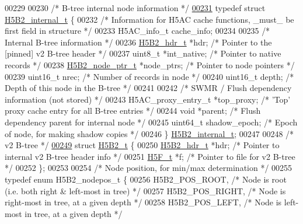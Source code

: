 \begin{DoxyCode}
{{00229 
00230 \textcolor{comment}{/* B-tree internal node information */}
\hyperlink{struct_h5_b2__internal__t}{00231} \textcolor{keyword}{typedef} \textcolor{keyword}{struct }\hyperlink{struct_h5_b2__internal__t}{H5B2\_internal\_t} \{
00232     \textcolor{comment}{/* Information for H5AC cache functions, \_must\_ be first field in structure */}
00233     H5AC\_info\_t cache\_info;
00234 
00235     \textcolor{comment}{/* Internal B-tree information */}
00236     \hyperlink{struct_h5_b2__hdr__t}{H5B2\_hdr\_t}    *hdr;       \textcolor{comment}{/* Pointer to the [pinned] v2 B-tree header   */}
00237     uint8\_t     *int\_native;    \textcolor{comment}{/* Pointer to native records                  */}
00238     \hyperlink{struct_h5_b2__node__ptr__t}{H5B2\_node\_ptr\_t} *node\_ptrs; \textcolor{comment}{/* Pointer to node pointers                   */}
00239     uint16\_t    nrec;           \textcolor{comment}{/* Number of records in node                  */}
00240     uint16\_t    depth;          \textcolor{comment}{/* Depth of this node in the B-tree           */}
00241 
00242     \textcolor{comment}{/* SWMR / Flush dependency information (not stored) */}
00243     H5AC\_proxy\_entry\_t *top\_proxy;  \textcolor{comment}{/* 'Top' proxy cache entry for all B-tree entries */}
00244     \textcolor{keywordtype}{void}        *parent;        \textcolor{comment}{/* Flush dependency parent for internal node  */}
00245     uint64\_t    shadow\_epoch;   \textcolor{comment}{/* Epoch of node, for making shadow copies */}
00246 \} \hyperlink{struct_h5_b2__internal__t}{H5B2\_internal\_t};
00247 
00248 \textcolor{comment}{/* v2 B-tree */}
\hyperlink{struct_h5_b2__t}{00249} \textcolor{keyword}{struct }\hyperlink{struct_h5_b2__t}{H5B2\_t} \{
00250     \hyperlink{struct_h5_b2__hdr__t}{H5B2\_hdr\_t}  *hdr;           \textcolor{comment}{/* Pointer to internal v2 B-tree header info */}
00251     \hyperlink{struct_h5_f__t}{H5F\_t}      *f;              \textcolor{comment}{/* Pointer to file for v2 B-tree */}
00252 \};
00253 
00254 \textcolor{comment}{/* Node position, for min/max determination */}
00255 \textcolor{keyword}{typedef} \textcolor{keyword}{enum} H5B2\_nodepos\_t \{
00256     H5B2\_POS\_ROOT,              \textcolor{comment}{/* Node is root (i.e. both right & left-most in tree) */}
00257     H5B2\_POS\_RIGHT,             \textcolor{comment}{/* Node is right-most in tree, at a given depth */}
00258     H5B2\_POS\_LEFT,              \textcolor{comment}{/* Node is left-most in tree, at a given depth */}
}}
\end{DoxyCode}
